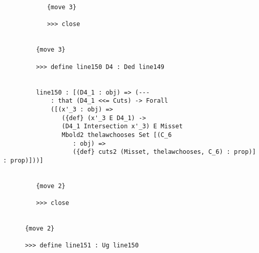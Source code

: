 \documentclass[12pt]{article}
\begin{document}
\begin{verbatim}
            {move 3}

            >>> close


         {move 3}

         >>> define line150 D4 : Ded line149


         line150 : [(D4_1 : obj) => (--- 
             : that (D4_1 <<= Cuts) -> Forall 
             ([(x'_3 : obj) => 
                ({def} (x'_3 E D4_1) -> 
                (D4_1 Intersection x'_3) E Misset 
                Mbold2 thelawchooses Set [(C_6 
                   : obj) => 
                   ({def} cuts2 (Misset, thelawchooses, C_6) : prop)] : prop)]))]


         {move 2}

         >>> close


      {move 2}

      >>> define line151 : Ug line150



\end{verbatim}
\end{document}
